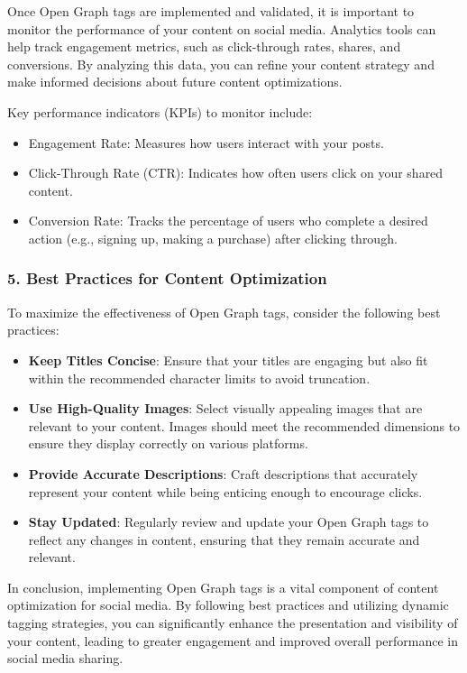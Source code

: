 Once Open Graph tags are implemented and validated, it is important to monitor the performance of your content on social media. Analytics tools can help track engagement metrics, such as click-through rates, shares, and conversions. By analyzing this data, you can refine your content strategy and make informed decisions about future content optimizations.

Key performance indicators (KPIs) to monitor include:

\begin{itemize}
    \item Engagement Rate: Measures how users interact with your posts.
    \item Click-Through Rate (CTR): Indicates how often users click on your shared content.
    \item Conversion Rate: Tracks the percentage of users who complete a desired action (e.g., signing up, making a purchase) after clicking through.
\end{itemize}

\subsubsection{5. Best Practices for Content Optimization}

To maximize the effectiveness of Open Graph tags, consider the following best practices:

\begin{itemize}
    \item \textbf{Keep Titles Concise}: Ensure that your titles are engaging but also fit within the recommended character limits to avoid truncation.
    \item \textbf{Use High-Quality Images}: Select visually appealing images that are relevant to your content. Images should meet the recommended dimensions to ensure they display correctly on various platforms.
    \item \textbf{Provide Accurate Descriptions}: Craft descriptions that accurately represent your content while being enticing enough to encourage clicks.
    \item \textbf{Stay Updated}: Regularly review and update your Open Graph tags to reflect any changes in content, ensuring that they remain accurate and relevant.
\end{itemize}

In conclusion, implementing Open Graph tags is a vital component of content optimization for social media. By following best practices and utilizing dynamic tagging strategies, you can significantly enhance the presentation and visibility of your content, leading to greater engagement and improved overall performance in social media sharing.


